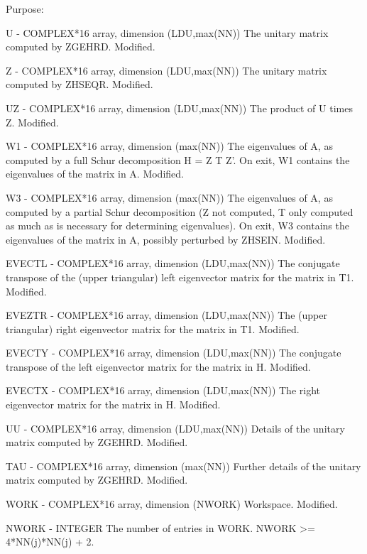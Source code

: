 \begin{DoxyParagraph}{Purpose\+: }
\begin{DoxyVerb}
  U      - COMPLEX*16 array, dimension (LDU,max(NN))
           The unitary matrix computed by ZGEHRD.
           Modified.

  Z      - COMPLEX*16 array, dimension (LDU,max(NN))
           The unitary matrix computed by ZHSEQR.
           Modified.

  UZ     - COMPLEX*16 array, dimension (LDU,max(NN))
           The product of U times Z.
           Modified.

  W1     - COMPLEX*16 array, dimension (max(NN))
           The eigenvalues of A, as computed by a full Schur
           decomposition H = Z T Z'.  On exit, W1 contains the
           eigenvalues of the matrix in A.
           Modified.

  W3     - COMPLEX*16 array, dimension (max(NN))
           The eigenvalues of A, as computed by a partial Schur
           decomposition (Z not computed, T only computed as much
           as is necessary for determining eigenvalues).  On exit,
           W3 contains the eigenvalues of the matrix in A, possibly
           perturbed by ZHSEIN.
           Modified.

  EVECTL - COMPLEX*16 array, dimension (LDU,max(NN))
           The conjugate transpose of the (upper triangular) left
           eigenvector matrix for the matrix in T1.
           Modified.

  EVEZTR - COMPLEX*16 array, dimension (LDU,max(NN))
           The (upper triangular) right eigenvector matrix for the
           matrix in T1.
           Modified.

  EVECTY - COMPLEX*16 array, dimension (LDU,max(NN))
           The conjugate transpose of the left eigenvector matrix
           for the matrix in H.
           Modified.

  EVECTX - COMPLEX*16 array, dimension (LDU,max(NN))
           The right eigenvector matrix for the matrix in H.
           Modified.

  UU     - COMPLEX*16 array, dimension (LDU,max(NN))
           Details of the unitary matrix computed by ZGEHRD.
           Modified.

  TAU    - COMPLEX*16 array, dimension (max(NN))
           Further details of the unitary matrix computed by ZGEHRD.
           Modified.

  WORK   - COMPLEX*16 array, dimension (NWORK)
           Workspace.
           Modified.

  NWORK  - INTEGER
           The number of entries in WORK.  NWORK >= 4*NN(j)*NN(j) + 2.


\end{DoxyVerb}
\end{DoxyParagraph}
